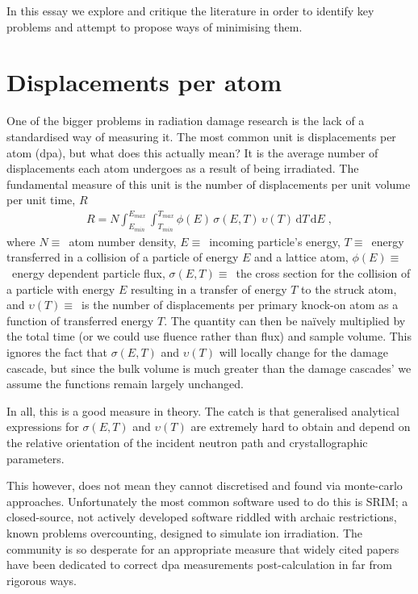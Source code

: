 \documentclass[12pt, a4paper]{article}
\newcommand{\da}{dpa}
\newcommand{\en}{energy}
\newcommand{\n}{neutron}
\begin{document}
		In this essay we explore and critique the literature in order to identify key problems and attempt to propose ways of minimising them.
		
		\section{Displacements per atom}\label{s:dpa}
		One of the bigger problems in radiation damage research is the lack of a standardised way of measuring it. The most common unit is displacements per atom (\da{}), but what does this actually mean? It is the average number of displacements each atom undergoes as a result of being irradiated. The fundamental measure of this unit is the number of displacements per unit volume per unit time, $R$
		\begin{align}
			R=N\int _{E_{min}}^{E_{max}}\int _{T_{min}}^{T_{max}}\phi (E)\,\sigma (E,T)\,\upsilon (T)\,\mathrm{d}T\,\mathrm{d}E\;,
		\end{align}
		where $N \equiv$~atom number density, $E \equiv$~incoming particle's \en{}, $T \equiv$~\en{} transferred in a collision of a particle of \en{} $E$ and a lattice atom, $\phi (E) \equiv$~\en{} dependent particle flux, $\sigma (E,T) \equiv$~the cross section for the collision of a particle with \en{} $E$ resulting in a transfer of \en{} $T$ to the struck atom, and $\upsilon (T) \equiv$~is the number of displacements per primary knock-on atom as a function of transferred \en{} $T$. The quantity can then be na\"{i}vely multiplied by the total time (or we could use fluence rather than flux) and sample volume. This ignores the fact that $\sigma (E,T)$ and $\upsilon (T)$ will locally change for the damage cascade, but since the bulk volume is much greater than the damage cascades' we assume the functions remain largely unchanged.
		
		In all, this is a good measure in theory. The catch is that generalised analytical expressions for $\sigma (E,T)$ and $\upsilon (T)$ are extremely hard to obtain and depend on the relative orientation of the incident \n{} path and crystallographic parameters.
		
		This however, does not mean they cannot discretised and found via monte-carlo approaches. Unfortunately the most common software used to do this is SRIM; a closed-source, not actively developed software riddled with archaic restrictions, known problems overcounting, designed to simulate ion irradiation. The community is so desperate for an appropriate measure that widely cited papers have been dedicated to correct \da{} measurements post-calculation in far from rigorous ways.
		
\end{document}
